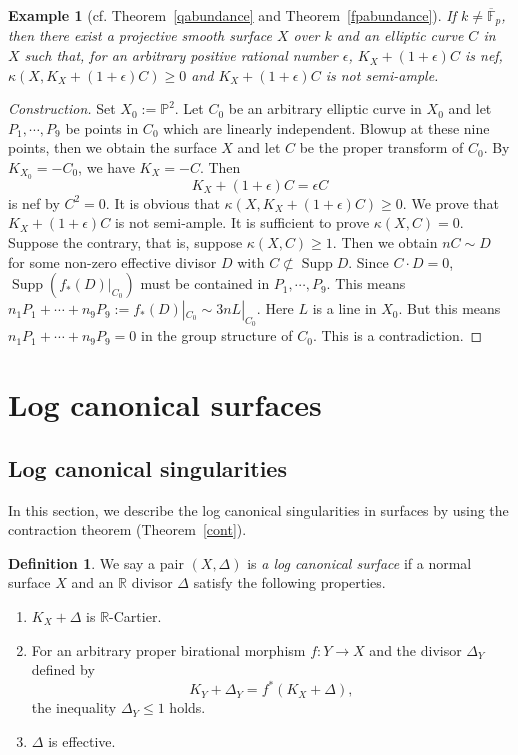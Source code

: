 \documentclass[12pt,twoside]{amsart}
\newcommand{\Supp}[0]{{\operatorname{Supp}}}
\newtheorem{ex}[thm]{Example}
\theoremstyle{definition}
\newtheorem{dfn}[thm]{Definition}
\begin{document}
\begin{ex}[cf. Theorem~\ref{qabundance} and Theorem~\ref{fpabundance}]
If $k\neq\overline{\mathbb{F}}_p$, then
there exist a projective smooth surface $X$ over $k$ and 
an elliptic curve $C$ in $X$ such that, 
for an arbitrary positive rational number $\epsilon$, 
$K_X+(1+\epsilon)C$ is nef, 
$\kappa(X, K_X+(1+\epsilon)C) \geq 0$ and 
$K_X+(1+\epsilon)C$ is not semi-ample. 
\end{ex}

\begin{proof}[Construction]
Set $X_0:=\mathbb{P}^2$. 
Let $C_0$ be an arbitrary elliptic curve in $X_0$ and 
let $P_1, \cdots, P_9$ be points in $C_0$ which are linearly independent. 
Blowup at these nine points, then we obtain the surface $X$ and 
let $C$ be the proper transform of $C_0$. 
By $K_{X_0}=-C_0$, we have $K_X=-C$. 
Then 
$$K_X+(1+\epsilon)C=\epsilon C$$ 
is nef by $C^2=0$. 
It is obvious that $\kappa(X, K_X+(1+\epsilon)C) \geq 0$. 
We prove that $K_X+(1+\epsilon)C$ is not semi-ample. 
It is sufficient to prove $\kappa(X, C)=0$. 
Suppose the contrary, 
that is, suppose $\kappa(X, C)\geq 1$. 
Then we obtain $nC \sim D$ for some non-zero effective divisor $D$ 
with $C\not\subset \Supp D$. 
Since $C\cdot D=0$, $\Supp(f_*(D)|_{C_0})$ must be contained in $P_1, \cdots, P_9$. 
This means 
$n_1P_1+ \cdots +n_9P_9:=f_*(D)|_{C_0} \sim 3nL|_{C_0}$. 
Here $L$ is a line in $X_0$. 
But this means $n_1P_1+ \cdots +n_9P_9=0$ 
in the group structure of $C_0$. 
This is a contradiction.
\end{proof}






\section{Log canonical surfaces}

\subsection{Log canonical singularities}
In this section, 
we describe the log canonical singularities in surfaces 
by using the contraction theorem (Theorem~\ref{cont}). 

\begin{dfn}
We say a pair $(X, \Delta)$ is {\em a log canonical surface} if 
a normal surface $X$ and an $\mathbb{R}$ divisor $\Delta$ 
satisfy the following properties. 
\begin{enumerate}
\item{$K_X+\Delta$ is $\mathbb{R}$-Cartier.}
\item{For an arbitrary proper birational morphism 
$f:Y \to X$ and the divisor $\Delta_Y$ defined by 
$$K_Y+\Delta_Y=f^*(K_X+\Delta),$$
the inequality $\Delta_Y\leq 1$ holds.}
\item{$\Delta$ is effective.}
\end{enumerate}
\end{dfn}
\end{document}
